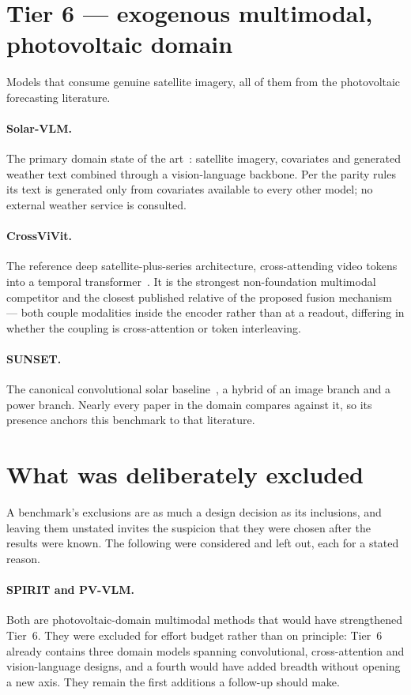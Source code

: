 \section{Tier 6 --- exogenous multimodal, photovoltaic domain}
\label{sec:tier6}

Models that consume genuine satellite imagery, all of them from the photovoltaic
forecasting literature.

\paragraph{Solar-VLM.} The primary domain state of the art~\cite{solarvlm}: satellite
imagery, covariates and generated weather text combined through a vision-language backbone.
Per the parity rules its text is generated only from covariates available to every other
model; no external weather service is consulted.

\paragraph{CrossViVit.} The reference deep satellite-plus-series architecture, cross-attending
video tokens into a temporal transformer~\cite{crossvivit}. It is the strongest non-foundation
multimodal competitor and the closest published relative of the proposed fusion mechanism ---
both couple modalities inside the encoder rather than at a readout, differing in whether the
coupling is cross-attention or token interleaving.

\paragraph{SUNSET.} The canonical convolutional solar baseline~\cite{sunset}, a hybrid of an
image branch and a power branch. Nearly every paper in the domain compares against it, so its
presence anchors this benchmark to that literature.

\section{What was deliberately excluded}
\label{sec:exclusions}

A benchmark's exclusions are as much a design decision as its inclusions, and leaving them
unstated invites the suspicion that they were chosen after the results were known. The
following were considered and left out, each for a stated reason.

\paragraph{SPIRIT and PV-VLM.} Both are photovoltaic-domain multimodal methods that would
have strengthened Tier~6. They were excluded for effort budget rather than on principle:
Tier~6 already contains three domain models spanning convolutional, cross-attention and
vision-language designs, and a fourth would have added breadth without opening a new axis.
They remain the first additions a follow-up should make.

